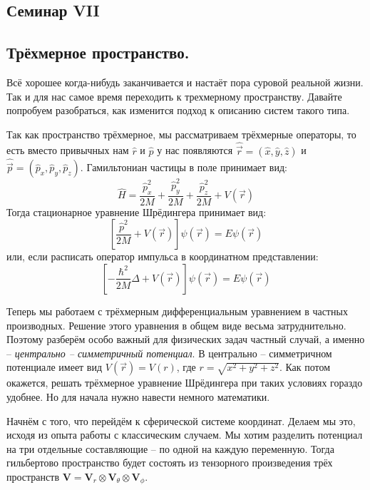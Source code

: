 \begin{center}
    \section{Семинар VII}
\end{center}
\subsection{Трёхмерное пространство.}
\hspace{1em} Всё хорошее когда-нибудь заканчивается и настаёт пора суровой реальной жизни. Так и для нас самое время переходить к трехмерному пространству. Давайте попробуем разобраться, как изменится подход к описанию систем такого типа.

Так как пространство трёхмерное, мы рассматриваем трёхмерные операторы, то есть вместо привычных нам $\hat{r}$ и $\hat{p}$ у нас появляются $\hat{\Vec{r}} = (\hat{x}, \hat{y}, \hat{z})$ и $\hat{\Vec{p}} = (\hat{p}_x, \hat{p}_y, \hat{p}_z)$. Гамильтониан частицы в поле принимает вид:
\[
\hat{H} = \frac{\hat{p}^2_x}{2M} + \frac{\hat{p}^2_y}{2M} + \frac{\hat{p}^2_z}{2M} + V(\Vec{r})
\]
Тогда стационарное уравнение Шрёдингера принимает вид:
\[
\left[\frac{\hat{p}^2}{2M} + V(\Vec{r})\right]\psi(\Vec{r}) = E\psi(\Vec{r})
\]
или, если расписать оператор импульса в координатном представлении:
\[
\left[-\frac{\hbar^2}{2M}\Delta + V(\Vec{r})\right]\psi(\Vec{r}) = E\psi(\Vec{r})
\]

Теперь мы работаем с трёхмерным дифференциальным уравнением в частных производных. Решение этого уравнения в общем виде весьма затруднительно. Поэтому разберём особо важный для физических задач частный случай, а именно -- \textit{центрально -- симметричный потенциал}. В центрально -- симметричном потенциале имеет вид $V(\Vec{r}) = V(r)$, где $r = \sqrt{x^2 + y^2 + z^2}$. Как потом окажется, решать трёхмерное уравнение Шрёдингера при таких условиях гораздо удобнее. Но для начала нужно навести немного математики. 

Начнём с того, что перейдём к сферической системе координат. Делаем мы это, исходя из опыта работы с классическим случаем. Мы хотим разделить потенциал на три отдельные составляющие -- по одной на каждую переменную. Тогда гильбертово пространство будет состоять из тензорного произведения трёх пространств $\mathbf{V} = \mathbf{V}_r \otimes \mathbf{V}_{\theta} \otimes \mathbf{V}_{\phi}$. 

